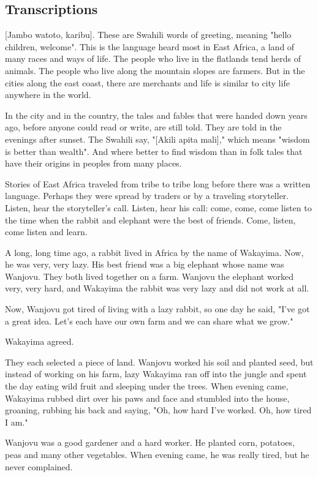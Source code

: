\subsection{Transcriptions}

[Jambo watoto, karibu]. These are Swahili words of greeting, meaning "hello children, welcome". This is the language heard most in East Africa, a land of many races and ways of life. The people who live in the flatlands tend herds of animals. The people who live along the mountain slopes are farmers. But in the cities along the east coast, there are merchants and life is similar to city life anywhere in the world.

In the city and in the country, the tales and fables that were handed down years ago, before anyone could read or write, are still told. They are told in the evenings after sunset. The Swahili say, "[Akili apita mali]," which means "wisdom is better than wealth". And where better to find wisdom than in folk tales that have their origins in peoples from many places.

Stories of East Africa traveled from tribe to tribe long before there was a written language. Perhaps they were spread by traders or by a traveling storyteller. Listen, hear the storyteller's call. Listen, hear his call: come, come, come listen to the time when the rabbit and elephant were the best of friends. Come, listen, come listen and learn.

A long, long time ago, a rabbit lived in Africa by the name of Wakayima. Now, he was very, very lazy. His best friend was a big elephant whose name was Wanjovu. They both lived together on a farm. Wanjovu the elephant worked very, very hard, and Wakayima the rabbit was very lazy and did not work at all.

Now, Wanjovu got tired of living with a lazy rabbit, so one day he said, "I've got a great idea. Let's each have our own farm and we can share what we grow."

Wakayima agreed.

They each selected a piece of land. Wanjovu worked his soil and planted seed, but instead of working on his farm, lazy Wakayima ran off into the jungle and spent the day eating wild fruit and sleeping under the trees. When evening came, Wakayima rubbed dirt over his paws and face and stumbled into the house, groaning, rubbing his back and saying, "Oh, how hard I've worked. Oh, how tired I am."

Wanjovu was a good gardener and a hard worker. He planted corn, potatoes, peas and many other vegetables. When evening came, he was really tired, but he never complained.

